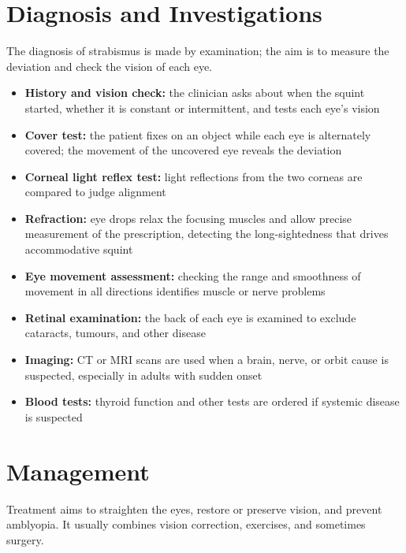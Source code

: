 \section*{Diagnosis and Investigations}
The diagnosis of strabismus is made by examination; the aim is to measure the deviation and check the vision of each eye.

\begin{itemize}
    \item \textbf{History and vision check:} the clinician asks about when the squint started, whether it is constant or intermittent, and tests each eye's vision
    \item \textbf{Cover test:} the patient fixes on an object while each eye is alternately covered; the movement of the uncovered eye reveals the deviation
    \item \textbf{Corneal light reflex test:} light reflections from the two corneas are compared to judge alignment
    \item \textbf{Refraction:} eye drops relax the focusing muscles and allow precise measurement of the prescription, detecting the long-sightedness that drives accommodative squint
    \item \textbf{Eye movement assessment:} checking the range and smoothness of movement in all directions identifies muscle or nerve problems
    \item \textbf{Retinal examination:} the back of each eye is examined to exclude cataracts, tumours, and other disease
    \item \textbf{Imaging:} CT or MRI scans are used when a brain, nerve, or orbit cause is suspected, especially in adults with sudden onset
    \item \textbf{Blood tests:} thyroid function and other tests are ordered if systemic disease is suspected
\end{itemize}

\section*{Management}
Treatment aims to straighten the eyes, restore or preserve vision, and prevent amblyopia. It usually combines vision correction, exercises, and sometimes surgery.

